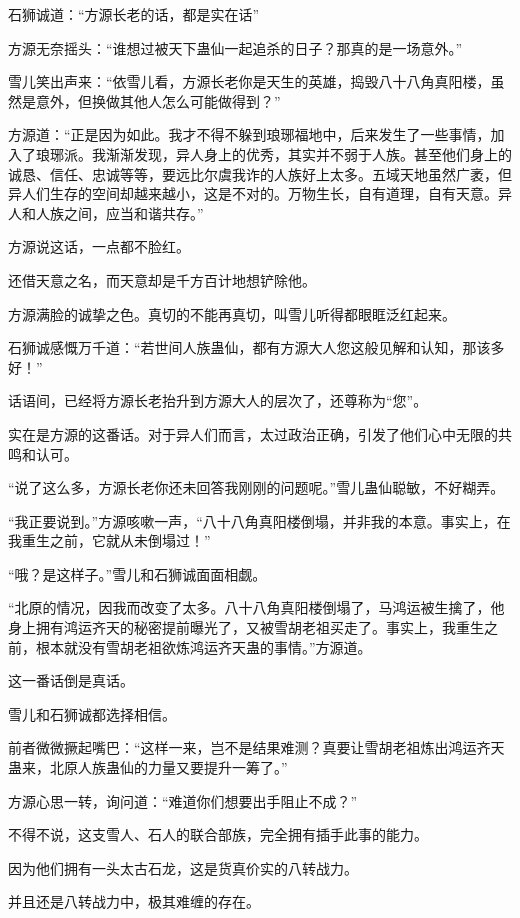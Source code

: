 \begin{this_body}
石狮诚道：“方源长老的话，都是实在话”

方源无奈摇头：“谁想过被天下蛊仙一起追杀的日子？那真的是一场意外。”

雪儿笑出声来：“依雪儿看，方源长老你是天生的英雄，捣毁八十八角真阳楼，虽然是意外，但换做其他人怎么可能做得到？”

方源道：“正是因为如此。我才不得不躲到琅琊福地中，后来发生了一些事情，加入了琅琊派。我渐渐发现，异人身上的优秀，其实并不弱于人族。甚至他们身上的诚恳、信任、忠诚等等，要远比尔虞我诈的人族好上太多。五域天地虽然广袤，但异人们生存的空间却越来越小，这是不对的。万物生长，自有道理，自有天意。异人和人族之间，应当和谐共存。”

方源说这话，一点都不脸红。

还借天意之名，而天意却是千方百计地想铲除他。

方源满脸的诚挚之色。真切的不能再真切，叫雪儿听得都眼眶泛红起来。

石狮诚感慨万千道：“若世间人族蛊仙，都有方源大人您这般见解和认知，那该多好！”

话语间，已经将方源长老抬升到方源大人的层次了，还尊称为“您”。

实在是方源的这番话。对于异人们而言，太过政治正确，引发了他们心中无限的共鸣和认可。

“说了这么多，方源长老你还未回答我刚刚的问题呢。”雪儿蛊仙聪敏，不好糊弄。

“我正要说到。”方源咳嗽一声，“八十八角真阳楼倒塌，并非我的本意。事实上，在我重生之前，它就从未倒塌过！”

“哦？是这样子。”雪儿和石狮诚面面相觑。

“北原的情况，因我而改变了太多。八十八角真阳楼倒塌了，马鸿运被生擒了，他身上拥有鸿运齐天的秘密提前曝光了，又被雪胡老祖买走了。事实上，我重生之前，根本就没有雪胡老祖欲炼鸿运齐天蛊的事情。”方源道。

这一番话倒是真话。

雪儿和石狮诚都选择相信。

前者微微撅起嘴巴：“这样一来，岂不是结果难测？真要让雪胡老祖炼出鸿运齐天蛊来，北原人族蛊仙的力量又要提升一筹了。”

方源心思一转，询问道：“难道你们想要出手阻止不成？”

不得不说，这支雪人、石人的联合部族，完全拥有插手此事的能力。

因为他们拥有一头太古石龙，这是货真价实的八转战力。

并且还是八转战力中，极其难缠的存在。


\end{this_body}
